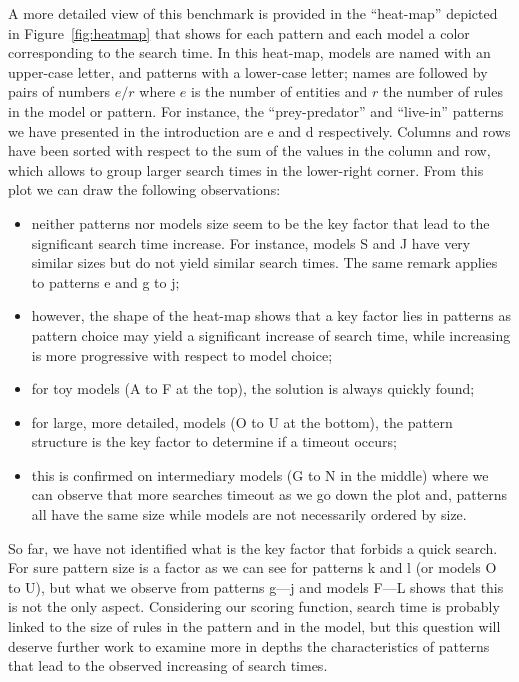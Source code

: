 \documentclass[a4paper,twoside]{article}
\begin{document}
A more detailed view of this benchmark is provided in the ``heat-map'' depicted in Figure~\ref{fig:heatmap} that shows for each pattern and each model a color corresponding to the search time.
In this heat-map, models are named with an upper-case letter, and patterns with a lower-case letter; names are followed by pairs of numbers $e/r$ where $e$ is the number of entities and $r$ the number of rules in the model or pattern.
For instance, the ``prey-predator'' and ``live-in'' patterns we have presented in the introduction are \textsf{e} and \textsf{d} respectively.
Columns and rows have been sorted with respect to the sum of the values in the column and row, which allows to group larger search times in the lower-right corner.
From this plot we can draw the following observations:
%
\begin{itemize}
\item neither patterns nor models size seem to be the key factor that lead to the significant search time increase. For instance, models \textsf{S} and \textsf{J} have very similar sizes but do not yield similar search times. The same remark applies to patterns \textsf{e} and \textsf{g} to \textsf{j};
\item however, the shape of the heat-map shows that a key factor lies in patterns as pattern choice may yield a significant increase of search time, while increasing is more progressive with respect to model choice;
\item for toy models (\textsf{A} to \textsf{F} at the top), the solution is always quickly found;
\item for large, more detailed, models (\textsf{O} to \textsf{U} at the bottom), the pattern structure is the key factor to determine if a timeout occurs;
\item this is confirmed on intermediary models (\textsf{G} to \textsf{N} in the middle) where we can observe that more searches timeout as we go down the plot and, patterns all have the same size while models are not necessarily ordered by size.
\end{itemize}
%
So far, we have not identified what is the key factor that forbids a quick search.
For sure pattern size is a factor as we can see for patterns \textsf{k} and \textsf{l} (or models \textsf{O} to \textsf{U}), but what we observe from patterns \textsf{g}---\textsf{j} and models \textsf{F}---\textsf{L} shows that this is not the only aspect.
Considering our scoring function, search time is probably linked to the size of rules in the pattern and in the model, but this question will deserve further work to examine more in depths the characteristics of patterns that lead to the observed increasing of search times.
\end{document}
